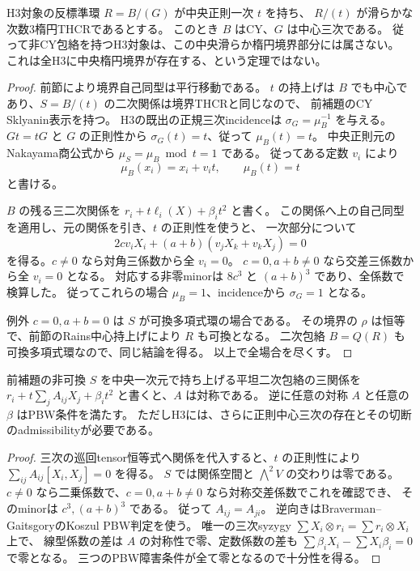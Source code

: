\begin{theorem}[このintrinsic境界部分での非CY包絡の排除]
\label{thm:central-elliptic-H3-envelope-CY}
H3対象の反標準環 $R=B/(G)$ が中央正則一次 $t$ を持ち、
$R/(t)$ が滑らかな次数3楕円THCRであるとする。
このとき $B$ はCY、$G$ は中心三次である。
従って非CY包絡を持つH3対象は、この中央滑らか楕円境界部分には属さない。
これは全H3に中央楕円境界が存在する、という定理ではない。
\end{theorem}
\begin{proof}
前節により境界自己同型は平行移動である。
$t$ の持上げは $B$ でも中心であり、$S=B/(t)$ の二次関係は境界THCRと同じなので、
前補題のCY Sklyanin表示を持つ。
H3の既出の正規三次incidenceは $\sigma_G=\mu_B^{-1}$ を与える。
$Gt=tG$ と $G$ の正則性から $\sigma_G(t)=t$、従って $\mu_B(t)=t$。
中央正則元のNakayama商公式\cite[Lemma 1.5]{RRZ}から
$\mu_S=\mu_B\bmod t=1$ である。
従ってある定数 $v_i$ により
\[
 \mu_B(x_i)=x_i+v_i t,\qquad\mu_B(t)=t
\]
と書ける。

$B$ の残る三二次関係を $r_i+t\ell_i(X)+\beta_i t^2$ と書く。
この関係へ上の自己同型を適用し、元の関係を引き、$t$ の正則性を使うと、
一次部分について
\[
 2c v_i X_i+(a+b)(v_jX_k+v_kX_j)=0
\]
を得る。$c\ne0$ なら対角三係数から全 $v_i=0$。
$c=0,a+b\ne0$ なら交差三係数から全 $v_i=0$ となる。
対応する非零minorは $8c^3$ と $(a+b)^3$ であり、全係数で検算した。
従ってこれらの場合 $\mu_B=1$、incidenceから $\sigma_G=1$ となる。

例外 $c=0,a+b=0$ は $S$ が可換多項式環の場合である。
その境界の $\rho$ は恒等で、前節のRains中心持上げにより $R$ も可換となる。
二次包絡 $B=Q(R)$ も可換多項式環なので、同じ結論を得る。
以上で全場合を尽くす。
\end{proof}

\begin{proposition}[非可換境界の全中央PBW持上げに対する制限]
\label{prop:central-sklyanin-linear-lifts-symmetric}
前補題の非可換 $S$ を中央一次元で持ち上げる平坦二次包絡の三関係を
$r_i+t\sum_j A_{ij}X_j+\beta_i t^2$ と書くと、$A$ は対称である。
逆に任意の対称 $A$ と任意の $\beta$ はPBW条件を満たす。
ただしH3には、さらに正則中心三次の存在とその切断のadmissibilityが必要である。
\end{proposition}
\begin{proof}
三次の巡回tensor恒等式へ関係を代入すると、$t$ の正則性により
$\sum_{ij}A_{ij}[X_i,X_j]=0$ を得る。
$S$ では関係空間と $\bigwedge^2V$ の交わりは零である。
$c\ne0$ なら二乗係数で、$c=0,a+b\ne0$ なら対称交差係数でこれを確認でき、
そのminorは $c^3,(a+b)^3$ である。
従って $A_{ij}=A_{ji}$。
逆向きはBraverman--GaitsgoryのKoszul PBW判定\cite[Theorem 0.5]{BG}を使う。
唯一の三次syzygy $\sum X_i\otimes r_i=\sum r_i\otimes X_i$ 上で、
線型係数の差は $A$ の対称性で零、定数係数の差も
$\sum\beta_iX_i-\sum X_i\beta_i=0$ で零となる。
三つのPBW障害条件が全て零となるので十分性を得る。
\end{proof}
